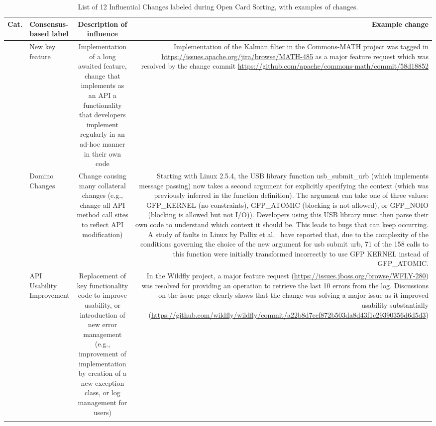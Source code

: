 \begin{table}[H]
\caption{List of 12 Influential Changes labeled during Open Card Sorting, with examples of changes.}
\scriptsize
	\begin{tabular} {r | l | c | r}
	{\bf Cat.} &{\bf Consensus-based label} & {\bf Description of influence} & {\bf Example change}\\ \hline 
	\multirow{1}{*}[0cm]{\rotatebox[origin=c]{90}{Adaptive/Perfective changes}} & New key feature & \multicolumn{1}{p{4cm}|}{Implementation of a long awaited feature, change that implements as an API a functionality that developers implement regularly in an ad-hoc manner in their own code} & \multicolumn{1}{p{5.5cm}}{Implementation of the Kalman filter in the Commons-MATH project was tagged in {\tiny \url{https://issues.apache.org/jira/browse/MATH-485}} as a major feature request which was resolved by the change commit {\tiny \url{https://github.com/apache/commons-math/commit/58d18852}}\vspace{1cm} }\\ \hline \hline
	\multirow{1}{*}[-1cm]{\rotatebox[origin=c]{90}{Cross-Area changes}}&Domino Changes & \multicolumn{1}{p{4cm}|}{Change causing many collateral changes (e.g., change all API method call sites to reflect API modification)} & \multicolumn{1}{p{5.5cm}}{Starting with Linux 2.5.4, the USB library function usb\_submit\_urb (which implements message passing) now takes a second argument for explicitly specifying the context (which was previously inferred in the function definition). The argument can take one of three values: GFP\_KERNEL (no constraints), GFP\_ATOMIC (blocking is not allowed), or GFP\_NOIO (blocking is allowed but not I/O)). Developers using this USB library must then parse their own code to understand which context it should be. This leads to bugs that can keep occurring. A study of faults in Linux by Pallix et al.~\cite{Palix10Faults} have reported that, due to the complexity of the conditions governing the choice of the new argument for usb submit urb, 71 of the 158 calls to this function were initially transformed incorrectly to use GFP KERNEL instead of GFP\_ATOMIC.}\\ \hline \hline
	\multirow{4}{*}[-3cm]{\rotatebox[origin=r]{90}{Preventive changes}}&API Usability Improvement &\multicolumn{1}{p{4cm}|}{Replacement of key functionality code to improve usability, or introduction of new error management (e.g., improvement of implementation by creation of a new exception class, or log management for users)} & \multicolumn{1}{p{5.5cm}}{In the Wildfly project, a major feature request ({\tiny \url{https://issues.jboss.org/browse/WFLY-280}}) was resolved for providing an operation to retrieve the last 10 errors from the log. Discussions on the issue page clearly shows that the change was solving a major issue as it improved usability substantially ({\tiny \url{https://github.com/wildfly/wildfly/commit/a22b8d7ccf872b503da8d43f1c29390356d6d5d3}}) }\\ \cline{2-4}

\end{tabular}
\end{table}
